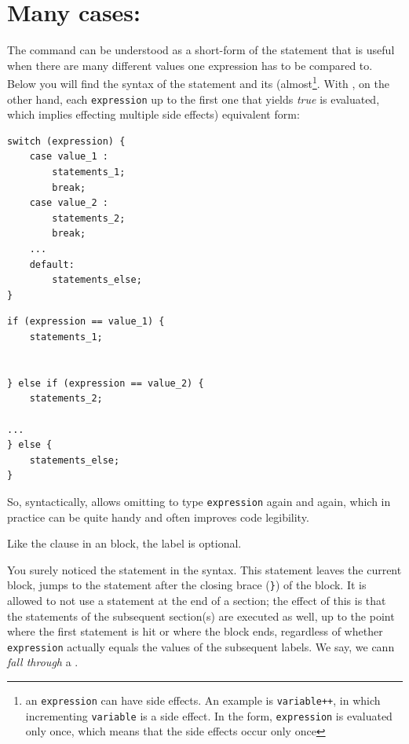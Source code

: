 \section{Many cases: }
The command  can be understood as a short-form of the  statement that is useful when there are many different values one expression has to be compared to. Below you will find the syntax of the  statement and its (almost\footnote{an \texttt{expression} can have side effects. An example is \texttt{variable++}, in which incrementing \texttt{variable} is a side effect. In the  form, \texttt{expression} is evaluated only once, which means that the side effects occur only once}. With , on the other hand, each \texttt{expression} up to the first one that yields \emph{true} is evaluated, which implies effecting multiple side effects) equivalent  form:

\begin{tcbraster}[raster columns=2,
                  raster equal height,
                  nobeforeafter,
                  raster column skip=0.2cm]
\begin{codebox}
\begin{verbatim}
switch (expression) {
    case value_1 :
        statements_1;
        break;
    case value_2 :
        statements_2;
        break;
    ...
    default:
        statements_else;
}
\end{verbatim}
\end{codebox}
%
\begin{codebox}
\begin{verbatim}
if (expression == value_1) {
    statements_1;
    
    
} else if (expression == value_2) {
    statements_2;
    
...
} else {
    statements_else;
}
\end{verbatim}
\end{codebox}
\end{tcbraster}

So, syntactically,  allows omitting to type \texttt{expression} again and again, which in practice can be quite handy and often improves code legibility.

Like the  clause in an  block, the  label is optional.

You surely noticed the  statement in the  syntax. This statement leaves the current block, \ie jumps to the statement after the closing brace (\texttt{\}}) of the  block. It is allowed to not use a  statement at the end of a  section; the effect of this is that the statements of the subsequent  section(s) are executed as well, up to the point where the first  statement is hit or where the  block ends, regardless of whether \texttt{expression} actually equals the values of the subsequent  labels. We say, we cann \emph{fall through} a .

